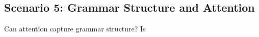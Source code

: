 \subsection{Scenario 5: Grammar Structure and Attention}
Can attention capture grammar structure? Is 
